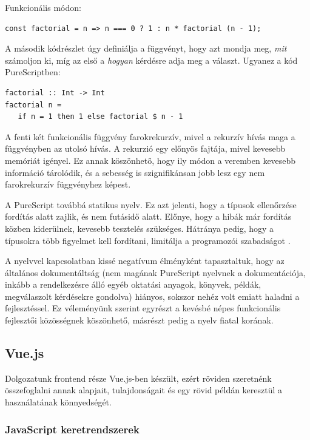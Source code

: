 \documentclass[12pt]{article}
\begin{document}
Funkcionális módon:
\begin{verbatim}
const factorial = n => n === 0 ? 1 : n * factorial (n - 1);
\end{verbatim}

A második kódrészlet úgy definiálja a függvényt, hogy azt mondja meg, \textit{mit} számoljon ki, míg az első a \textit{hogyan} kérdésre adja meg a választ. Ugyanez a kód PureScriptben:

\begin{verbatim}
factorial :: Int -> Int
factorial n =
   if n = 1 then 1 else factorial $ n - 1
\end{verbatim}

A fenti két funkcionális függvény farokrekurzív, mivel a rekurzív hívás maga a függvényben az utolsó hívás. A rekurzió egy előnyös fajtája, mivel kevesebb memóriát igényel. Ez annak köszönhető, hogy ily módon a veremben kevesebb információ tárolódik, és a sebesség is szignifikánsan jobb lesz egy nem farokrekurzív függvényhez képest.

A PureScript továbbá statikus nyelv.  Ez azt jelenti, hogy a típusok ellenőrzése fordítás alatt zajlik, és nem futásidő alatt. Előnye, hogy a hibák már fordítás közben kiderülnek,  kevesebb tesztelés szükséges. Hátránya pedig, hogy a típusokra több figyelmet kell fordítani, limitálja a programozói szabadságot \cite{CS}.

A nyelvvel kapcsolatban kissé negatívum élményként tapasztaltuk, hogy az általános dokumentáltság (nem magának PureScript nyelvnek a dokumentációja, inkább a rendelkezésre álló egyéb oktatási anyagok, könyvek, példák, megválaszolt kérdésekre gondolva) hiányos, sokszor nehéz volt emiatt haladni a fejlesztéssel. Ez véleményünk szerint egyrészt a kevésbé népes funkcionális fejlesztői közösségnek köszönhető, másrészt pedig a nyelv fiatal korának.

\newpage
\subsection{Vue.js}

Dolgozatunk frontend része Vue.js-ben készült,  ezért röviden szeretnénk összefoglalni annak alapjait, tulajdonságait és egy rövid példán keresztül a használatának könnyedségét.

\subsubsection{JavaScript keretrendszerek}
\end{document}
